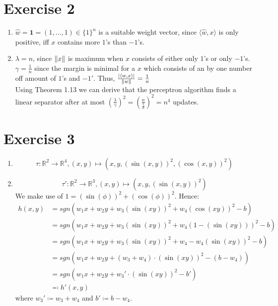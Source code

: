 \documentclass[12pt]{article}
\DeclarePairedDelimiter\abs{\lvert}{\rvert}
\DeclarePairedDelimiter\Abs{\lVert}{\rVert}
\begin{document}
\section*{Exercise 2}
\begin{enumerate}[label=(\alph*)]
	\item	$\hat{w}=\textbf{1}=(1, \dots, 1) \in \{1\}^n$ is a suitable weight vector, since $\langle \hat{w},x \rangle$ is only positive, iff $x$ contains more $1$'s than $-1$'s.
	\item	$\lambda = n$, since $\Abs{x}$ is maximum when $x$ consists of either only $1$'s or only $-1$'s. \\
			$\gamma = \frac{1}{n}$ since the margin is minimal for a $x$ which consists of an by one number off amount of $1$'s and $-1'$. Thus, $\frac{\abs{\langle w,x \rangle}}{\Abs{w}} = \frac{1}{n}$ \\
			Using Theorem 1.13 we can derive that the perceptron algorithm finds a linear separator after at most $\left(\frac{\lambda}{\gamma}\right)^2 = \left( \frac{n}{\frac{1}{n}}\right)^2 = n^4$ updates.
\end{enumerate}

\section*{Exercise 3}
\begin{enumerate}[label=(\alph*)]
	\item	\[\tau : \mathbb{R}^2 \rightarrow \mathbb{R}^4, (x,y) \mapsto (x,y,(\sin(x,y))^2, (\cos(x,y))^2)\]
	\item	\[\tau' : \mathbb{R}^2 \rightarrow \mathbb{R}^3, (x,y) \mapsto (x,y, (\sin(x,y))^2)\]
			We make use of $1 = (\sin(\phi))^2 + (\cos(\phi))^2$. Hence:
			\begin{align*}
				h(x,y) &= sgn(w_1 x + w_2 y + w_3 (\sin(xy))^2 + w_4 (\cos(xy))^2 - b) \\
				&= sgn(w_1 x + w_2 y + w_3 (\sin(xy))^2 + w_4 (1-(\sin(xy)))^2 - b) \\
				&= sgn(w_1 x + w_2 y + w_3 (\sin(xy))^2 + w_4 - w_4 (\sin(xy))^2 - b) \\
				&= sgn(w_1 x + w_2 y + (w_3 + w_4) \cdot (\sin(xy))^2 - (b - w_4)) \\
				&= sgn(w_1 x + w_2 y + w_3' \cdot (\sin(xy))^2 - b') \\
				&\eqqcolon h'(x,y)
			\end{align*}
			where $w_3' \coloneqq w_3 + w_4$ and $b' \coloneqq b - w_4$.
\end{enumerate}
\end{document}
